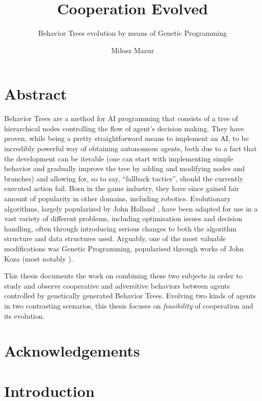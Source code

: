 \documentclass[12pt]{scrreprt}
\begin{document}
\author{Miłosz Mazur}
\title{Cooperation Evolved}
\subtitle{Behavior Trees evolution by means of Genetic Programming}
\maketitle

\newpage
\chapter*{Abstract}
Behavior Trees are a method for AI programming that consists of a tree of hierarchical nodes controlling the flow of agent's decision making. They have proven, while being a pretty straightforward means to implement an AI, to be incredibly powerful way of obtaining autonomous agents, both due to a fact that the development can be iterable (one can start with implementing simple behavior and gradually improve the tree by adding and modifying nodes and branches) and allowing for, so to say, ``fallback tactics'', should the currently executed action fail.  Born in the game industry, they have since gained fair amount of popularity in other domains, including robotics.
Evolutionary algorithms, largely popularized by John Holland \cite{hollandadaptation}, have been adapted for use in a vast variety of different problems, including optimisation issues and decision handling, often through introducing serious changes to both the algorithm structure and data structures used. Arguably, one of the most valuable modifications was Genetic Programming, popularised through works of John Koza (most notably \cite{kozagp}).

This thesis documents the work on combining these two subjects in order to study and observe cooperative and adversitive behaviors between agents controlled by genetically generated Behavior Trees. Evolving two kinds of agents in two contrasting scenarios, this thesis focuses on \textit{feasibility} of cooperation and its evolution.  %

\chapter*{Acknowledgements}

\tableofcontents
\listoffigures
\listoftables
\chapter{Introduction}
\label{chapter_introduction}

\end{document}
